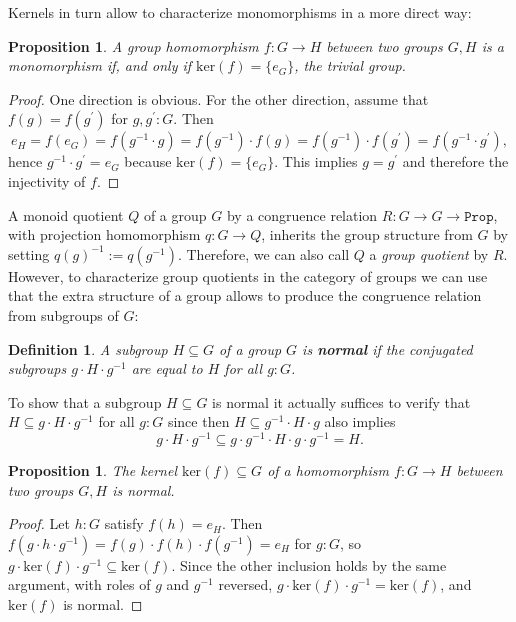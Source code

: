 \documentclass{amsart}
\theoremstyle{plain}
\numberwithin{equation}{section} %
\numberwithin{figure}{section} %
\theoremstyle{plain}
\theoremstyle{plain}
\theoremstyle{plain}
\theoremstyle{plain}
\theoremstyle{plain}
\newtheorem{prop}[thm]{Proposition} %
\theoremstyle{plain}
\newtheorem{Def}[thm]{Definition} %
\theoremstyle{remark}
\theoremstyle{remark}
\theoremstyle{remark}
\begin{document}
Kernels in turn allow to characterize monomorphisms in a more direct way:
\begin{prop} \label{ker-mono-prop}  %
A group homomorphism $f : G \rightarrow H$ between two groups $G, H$ is a monomorphism if, and only if $\mathrm{ker}(f) = \{e_G\}$, the trivial group. 
\end{prop} 
\begin{proof}
One direction is obvious. For the other direction, assume that $f(g) = f(g^\prime)$ for $g, g^\prime : G$. Then
\[ e_H = f(e_G) = f(g^{-1} \cdot g) = f(g^{-1}) \cdot f(g) = f(g^{-1}) \cdot f(g^\prime) = f(g^{-1} \cdot g^\prime),   \]
hence $g^{-1} \cdot g^\prime = e_G$ because $\mathrm{ker}(f) = \{e_G\}$. This implies $g = g^\prime$ and therefore the injectivity of $f$.
\end{proof}

A monoid quotient $Q$ of a group $G$ by a congruence relation $R : G \rightarrow G \rightarrow \texttt{Prop}$, with projection homomorphism $q : G \rightarrow Q$, inherits the group structure from $G$ by setting $q(g)^{-1} := q(g^{-1})$. Therefore, we can also call $Q$ a \textit{group quotient} by $R$.
However, to characterize group quotients in the category of groups we can use that the extra structure of a group allows to produce the congruence relation from subgroups of $G$:  

\begin{Def}
A subgroup $H \subseteq G$ of a group $G$ is \textbf{normal} if the conjugated subgroups $g \cdot H \cdot g^{-1}$ are equal to $H$ for all $g : G$. 
\end{Def}

To show that a subgroup $H \subseteq G$ is normal it actually suffices to verify that $H \subseteq g \cdot H \cdot g^{-1}$ for all $g : G$ since then $H \subseteq g^{-1} \cdot H \cdot g$ also implies
\[ g \cdot H \cdot g^{-1} \subseteq g \cdot g^{-1} \cdot H \cdot g \cdot g^{-1} = H. \]

\begin{prop} \label{ker-norm-prop}    %
The kernel $\mathrm{ker}(f) \subseteq G$ of a homomorphism $f : G \rightarrow H$ between two groups $G, H$ is normal.
\end{prop}
\begin{proof}
Let $h : G$ satisfy $f(h) = e_H$. Then $f(g \cdot h \cdot g^{-1}) = f(g) \cdot f(h) \cdot f(g^{-1}) = e_H$ for $g : G$, so $g \cdot \mathrm{ker}(f) \cdot g^{-1} \subseteq \mathrm{ker}(f)$. Since the other inclusion holds by the same argument, with roles of $g$ and $g^{-1}$ reversed, $g \cdot \mathrm{ker}(f) \cdot g^{-1} = \mathrm{ker}(f)$, and $\mathrm{ker}(f)$ is normal.
\end{proof}
\end{document}
